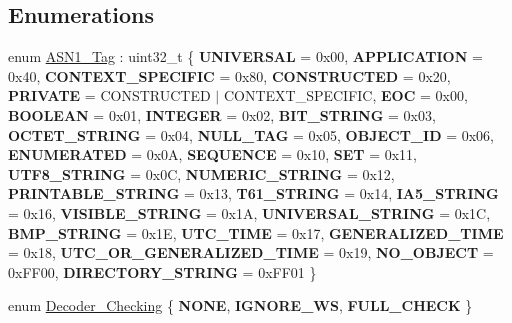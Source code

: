\subsection*{Enumerations}
\begin{DoxyCompactItemize}
\item 
enum \mbox{\hyperlink{namespace_botan_acc1ab433420bdddbcfe52dbbd94e8576}{A\+S\+N1\+\_\+\+Tag}} \+: uint32\+\_\+t \{ \newline
{\bfseries U\+N\+I\+V\+E\+R\+S\+AL} = 0x00, 
{\bfseries A\+P\+P\+L\+I\+C\+A\+T\+I\+ON} = 0x40, 
{\bfseries C\+O\+N\+T\+E\+X\+T\+\_\+\+S\+P\+E\+C\+I\+F\+IC} = 0x80, 
{\bfseries C\+O\+N\+S\+T\+R\+U\+C\+T\+ED} = 0x20, 
\newline
{\bfseries P\+R\+I\+V\+A\+TE} = C\+O\+N\+S\+T\+R\+U\+C\+T\+ED $\vert$ C\+O\+N\+T\+E\+X\+T\+\_\+\+S\+P\+E\+C\+I\+F\+IC, 
{\bfseries E\+OC} = 0x00, 
{\bfseries B\+O\+O\+L\+E\+AN} = 0x01, 
{\bfseries I\+N\+T\+E\+G\+ER} = 0x02, 
\newline
{\bfseries B\+I\+T\+\_\+\+S\+T\+R\+I\+NG} = 0x03, 
{\bfseries O\+C\+T\+E\+T\+\_\+\+S\+T\+R\+I\+NG} = 0x04, 
{\bfseries N\+U\+L\+L\+\_\+\+T\+AG} = 0x05, 
{\bfseries O\+B\+J\+E\+C\+T\+\_\+\+ID} = 0x06, 
\newline
{\bfseries E\+N\+U\+M\+E\+R\+A\+T\+ED} = 0x0A, 
{\bfseries S\+E\+Q\+U\+E\+N\+CE} = 0x10, 
{\bfseries S\+ET} = 0x11, 
{\bfseries U\+T\+F8\+\_\+\+S\+T\+R\+I\+NG} = 0x0C, 
\newline
{\bfseries N\+U\+M\+E\+R\+I\+C\+\_\+\+S\+T\+R\+I\+NG} = 0x12, 
{\bfseries P\+R\+I\+N\+T\+A\+B\+L\+E\+\_\+\+S\+T\+R\+I\+NG} = 0x13, 
{\bfseries T61\+\_\+\+S\+T\+R\+I\+NG} = 0x14, 
{\bfseries I\+A5\+\_\+\+S\+T\+R\+I\+NG} = 0x16, 
\newline
{\bfseries V\+I\+S\+I\+B\+L\+E\+\_\+\+S\+T\+R\+I\+NG} = 0x1A, 
{\bfseries U\+N\+I\+V\+E\+R\+S\+A\+L\+\_\+\+S\+T\+R\+I\+NG} = 0x1C, 
{\bfseries B\+M\+P\+\_\+\+S\+T\+R\+I\+NG} = 0x1E, 
{\bfseries U\+T\+C\+\_\+\+T\+I\+ME} = 0x17, 
\newline
{\bfseries G\+E\+N\+E\+R\+A\+L\+I\+Z\+E\+D\+\_\+\+T\+I\+ME} = 0x18, 
{\bfseries U\+T\+C\+\_\+\+O\+R\+\_\+\+G\+E\+N\+E\+R\+A\+L\+I\+Z\+E\+D\+\_\+\+T\+I\+ME} = 0x19, 
{\bfseries N\+O\+\_\+\+O\+B\+J\+E\+CT} = 0x\+F\+F00, 
{\bfseries D\+I\+R\+E\+C\+T\+O\+R\+Y\+\_\+\+S\+T\+R\+I\+NG} = 0x\+F\+F01
 \}
\item 
enum \mbox{\hyperlink{namespace_botan_acd5baf937a9984c39f8b44104dde76ae}{Decoder\+\_\+\+Checking}} \{ {\bfseries N\+O\+NE}, 
{\bfseries I\+G\+N\+O\+R\+E\+\_\+\+WS}, 
{\bfseries F\+U\+L\+L\+\_\+\+C\+H\+E\+CK}
 \}
\item 

\end{DoxyCompactItemize}
